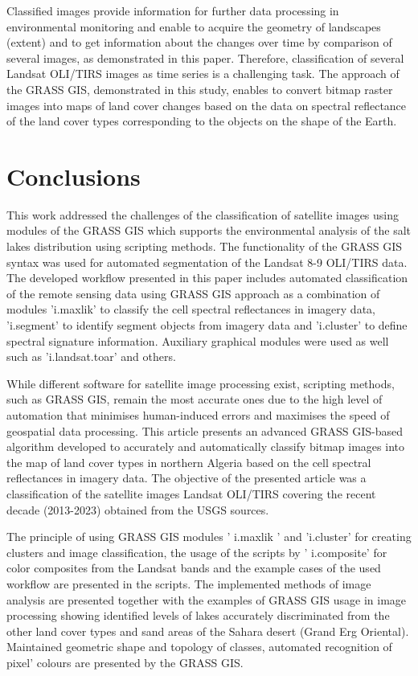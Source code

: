 \documentclass[asi,article,submit,pdftex,moreauthors]{Definitions/mdpi}
\begin{document}
Classified images provide information for further data processing in environmental monitoring and enable to acquire the geometry of landscapes (extent) and to get information about the changes over time by comparison of several images, as demonstrated in this paper. Therefore, classification of several Landsat OLI/TIRS images as time series is a challenging task. The approach of the GRASS GIS, demonstrated in this study, enables to convert bitmap raster images into maps of land cover changes based on the data on spectral reflectance of the land cover types corresponding to the objects on the shape of the Earth.

\section{Conclusions}
This work addressed the challenges of the classification of satellite images using modules of the GRASS GIS which supports the environmental analysis of the salt lakes distribution using scripting methods. The functionality of the GRASS GIS syntax was used for automated segmentation of the Landsat 8-9 OLI/TIRS data. The developed workflow presented in this paper includes automated classification of the remote sensing data using GRASS GIS approach as a combination of modules 'i.maxlik' to classify the cell spectral reflectances in imagery data, 'i.segment' to identify segment objects from imagery data and 'i.cluster' to define spectral signature information. Auxiliary graphical modules were used as well such as 'i.landsat.toar' and others.

While different software for satellite image processing exist, scripting methods, such as GRASS GIS, remain the most accurate ones due to the high level of automation that minimises human-induced errors and maximises the speed of geospatial data processing. This article presents an advanced GRASS GIS-based algorithm developed to accurately and automatically classify bitmap images into the map of land cover types in northern Algeria based on the cell spectral reflectances in imagery data. The objective of the presented article was a classification of the satellite images Landsat OLI/TIRS covering the recent decade (2013-2023) obtained from the USGS sources. 

The principle of using GRASS GIS modules ' i.maxlik ' and 'i.cluster' for creating clusters and image classification, the usage of the scripts by ' i.composite' for color composites from the Landsat bands and the example cases of the used workflow are presented in the scripts. The implemented methods of image analysis are presented together with the examples of GRASS GIS usage in image processing showing identified levels of lakes accurately discriminated from the other land cover types and sand areas of the Sahara desert (Grand Erg Oriental). Maintained geometric shape and topology of classes, automated recognition of pixel’ colours are presented by the GRASS GIS. 
\end{document}
